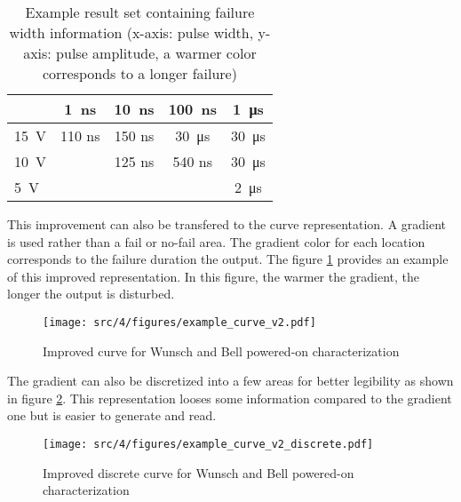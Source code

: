 \begin{table}[!h]
\centering
\begin{tabular}{@{}lcccc@{}}
\toprule
                & \SI{1}{\nano\second}         & \SI{10}{\nano\second}        & \SI{100}{\nano\second}                        & \SI{1}{\micro\second}     \\ \midrule
\SI{15}{\volt} & {\color[HTML]{00D2CB}110 ns} & {\color[HTML]{FFCB2F}150 ns} & {\color[HTML]{FE0000}\SI{30}{\micro\second}}  & {\color[HTML]{FE0000} \SI{30}{\micro\second}} \\
\SI{10}{\volt} & {\color[HTML]{32CB00}}       & {\color[HTML]{00D2CB}125 ns} & {\color[HTML]{F8A102}540 ns}                  & {\color[HTML]{FE0000} \SI{30}{\micro\second}} \\
\SI{5}{\volt}  & {\color[HTML]{32CB00}}       & {\color[HTML]{32CB00} }      & {\color[HTML]{32CB00} }                       & {\color[HTML]{F56B00} \SI{2}{\micro\second}}  \\
\bottomrule
\end{tabular}
\caption{Example result set containing failure width information (x-axis: pulse width, y-axis: pulse amplitude, a warmer color corresponds to a longer failure)}
\label{simulation-results-bis}
\end{table}

This improvement can also be transfered to the curve representation.
A gradient is used rather than a fail or no-fail area.
The gradient color for each location corresponds to the failure duration the output.
The figure \ref{wb_cz_curve_example_v2} provides an example of this improved representation.
In this figure, the warmer the gradient, the longer the output is disturbed.

\begin{figure}[!h]
  \centering
  \texttt{[image: src/4/figures/example\_curve\_v2.pdf]}
  \caption{Improved curve for Wunsch and Bell powered-on characterization}
  \label{wb_cz_curve_example_v2}
\end{figure}

The gradient can also be discretized into a few areas for better legibility as shown in figure \ref{wb_cz_curve_example_v2_discrete}.
This representation looses some information compared to the gradient one but is easier to generate and read.

\begin{figure}[!h]
  \centering
  \texttt{[image: src/4/figures/example\_curve\_v2\_discrete.pdf]}
  \caption{Improved discrete curve for Wunsch and Bell powered-on characterization}
  \label{wb_cz_curve_example_v2_discrete}
\end{figure}

